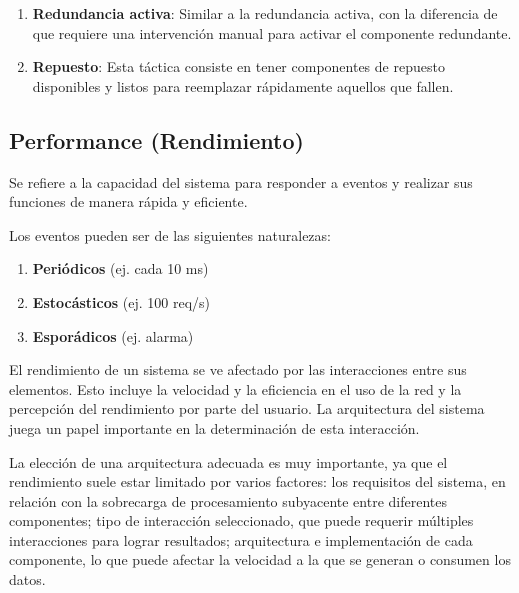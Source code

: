 \documentclass{article}
\begin{document}
\begin{itemize}
\begin{enumerate}
					\item \textbf{Redundancia activa}: Similar a la redundancia activa, con la diferencia de que requiere una intervención manual para activar el componente redundante.
					
					\item \textbf{Repuesto}: Esta táctica consiste en tener componentes de repuesto disponibles y listos para reemplazar rápidamente aquellos que fallen.
					
					
				\end{enumerate}
				
				
			\end{itemize}
				
		
		
		
		
		\subsection{Performance \small{(Rendimiento)}}
		 Se refiere a la capacidad del sistema para responder a eventos y realizar sus funciones de manera rápida y eficiente.
		 
		 Los eventos pueden ser de las siguientes naturalezas: 
		 \begin{enumerate}
		 	\item \textbf{Periódicos} (ej. cada 10 ms)
		 	
		 	\item \textbf{Estocásticos}  (ej. 100 req/s)
		 	
		 	\item \textbf{Esporádicos}  (ej. alarma)
		 \end{enumerate}
		 
		 El rendimiento de un sistema se ve afectado por las interacciones entre sus elementos. Esto incluye la velocidad y la eficiencia en el uso de la red y la percepción del rendimiento por parte del usuario. La arquitectura del sistema juega un papel importante en la determinación de esta interacción.
		 
		 La elección de una arquitectura adecuada es muy importante, ya que el rendimiento suele estar limitado por varios factores: los requisitos del sistema, en relación con la sobrecarga de procesamiento subyacente entre diferentes componentes; tipo de interacción seleccionado, que puede requerir múltiples interacciones para lograr resultados; arquitectura e implementación de cada componente, lo que puede afectar la velocidad a la que se generan o consumen los datos.
		 
\end{document}
